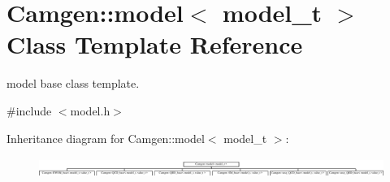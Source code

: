 \hypertarget{a00370}{\section{Camgen\-:\-:model$<$ model\-\_\-t $>$ Class Template Reference}
\label{a00370}
}


model base class template.  




{\ttfamily \#include $<$model.\-h$>$}

Inheritance diagram for Camgen\-:\-:model$<$ model\-\_\-t $>$\-:\begin{figure}[H]
\begin{center}
\leavevmode
\includegraphics[height=0.657277cm]{a00370}
\end{center}
\end{figure}
